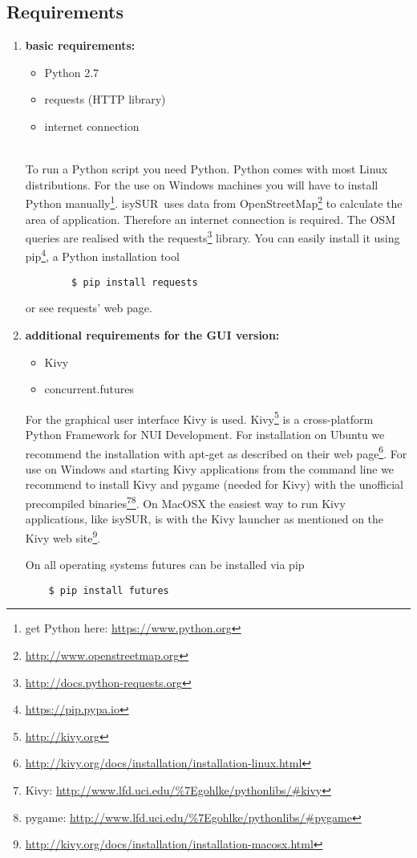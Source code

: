 \documentclass[11pt,fleqn]{book} %
\newcommand{\ProjectTitle}{isySUR}
\newcommand{\pt}{\ProjectTitle}
\begin{document}
\subsection{Requirements}\label{sec:requirements}
\begin{enumerate}
	\item \textbf{basic requirements:}
	\begin{itemize}
		\item Python 2.7
		\item requests (HTTP library)
		\item internet connection
	\end{itemize}
	~\\
	To run a Python script you need Python. Python comes with most Linux distributions. For the use on Windows machines you will have to install Python manually\footnote{get Python here: \url{https://www.python.org}}. \pt\ uses data from OpenStreetMap\footnote{\url{http://www.openstreetmap.org}} to calculate the area of application. Therefore an internet connection is required. The OSM queries are realised with the requests\footnote{\url{http://docs.python-requests.org}\label{fn:requests}} library. You can easily install it using pip\footnote{\url{https://pip.pypa.io}}, a Python installation tool
	\begin{verbatim}
		$ pip install requests
	\end{verbatim}
	or see requests' web page.
	\newpage
	\item \textbf{additional requirements for the GUI version:}
	\begin{itemize}
		\item Kivy
		\item concurrent.futures
	\end{itemize}
	For the graphical user interface Kivy is used. Kivy\footnote{\url{http://kivy.org}\label{fn:kivy}} is a cross-platform Python Framework for NUI Development. For installation on Ubuntu we recommend the installation with apt-get as described on their web page\footnote{\url{http://kivy.org/docs/installation/installation-linux.html}}. For use on Windows and starting Kivy applications from the command line we recommend to install Kivy and pygame (needed for Kivy) with the unofficial precompiled binaries\footnote{Kivy: \url{http://www.lfd.uci.edu/\%7Egohlke/pythonlibs/\#kivy}}\footnote{pygame: \url{http://www.lfd.uci.edu/\%7Egohlke/pythonlibs/\#pygame}}. On MacOSX the easiest way to run Kivy applications, like \pt, is with the Kivy launcher as mentioned on the Kivy web site\footnote{\url{http://kivy.org/docs/installation/installation-macosx.html}}.
	
On all operating systems futures can be installed via pip
\begin{verbatim}
	$ pip install futures
\end{verbatim}
\end{enumerate}
\end{document}
